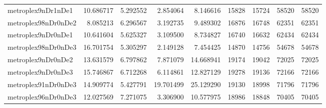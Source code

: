 \begin{longtable}{|l|r|r|r|r|r|r|r|r|}
metroplex9nDr1nDe1 & 10.686717 & 5.292552 & 2.854064 & 8.146616 & 15828 & 15724 & 58520 & 58520 \\
metroplex98nDr0nDe2 & 8.085213 & 6.296567 & 3.192735 & 9.489302 & 16876 & 16748 & 62351 & 62351 \\
metroplex9nDr0nDe1 & 10.641604 & 5.625327 & 3.109500 & 8.734827 & 16740 & 16632 & 62434 & 62434 \\
metroplex98nDr0nDe3 & 16.701754 & 5.305297 & 2.149128 & 7.454425 & 14870 & 14756 & 54678 & 54678 \\
metroplex9nDr0nDe2 & 13.631579 & 6.797862 & 7.871079 & 14.668941 & 19174 & 19042 & 72025 & 72025 \\
metroplex9nDr0nDe3 & 15.746867 & 6.712268 & 6.114861 & 12.827129 & 19278 & 19136 & 72166 & 72166 \\
metroplex91nDr0nDe3 & 14.909774 & 5.427791 & 19.701499 & 25.129290 & 19130 & 18998 & 71796 & 71796 \\
metroplex96nDr0nDe3 & 12.027569 & 7.271075 & 3.306900 & 10.577975 & 18986 & 18848 & 70405 & 70405 \\
\end{longtable}
